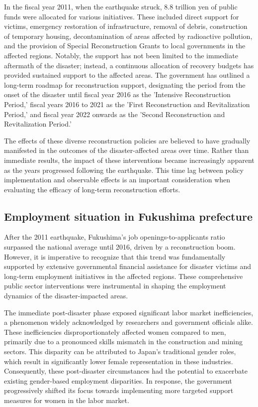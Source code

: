 \documentclass[a4paper,12pt]{article}
\begin{document}
In the fiscal year 2011, when the earthquake struck, 8.8 trillion yen of public funds were allocated for various initiatives. These included direct support for victims, emergency restoration of infrastructure, removal of debris, construction of temporary housing, decontamination of areas affected by radioactive pollution, and the provision of Special Reconstruction Grants to local governments in the affected regions. Notably, the support has not been limited to the immediate aftermath of the disaster; instead, a continuous allocation of recovery budgets has provided sustained support to the affected areas. The government has outlined a long-term roadmap for reconstruction support, designating the period from the onset of the disaster until fiscal year 2016 as the 'Intensive Reconstruction Period,' fiscal years 2016 to 2021 as the 'First Reconstruction and Revitalization Period,' and fiscal year 2022 onwards as the 'Second Reconstruction and Revitalization Period.'

The effects of these diverse reconstruction policies are believed to have gradually manifested in the outcomes of the disaster-affected areas over time. Rather than immediate results, the impact of these interventions became increasingly apparent as the years progressed following the earthquake. This time lag between policy implementation and observable effects is an important consideration when evaluating the efficacy of long-term reconstruction efforts.


\subsection{Employment situation in Fukushima prefecture}

After the 2011 earthquake, Fukushima's job openings-to-applicants ratio surpassed the national average until 2016, driven by a reconstruction boom. However, it is imperative to recognize that this trend was fundamentally supported by extensive governmental financial assistance for disaster victims and long-term employment initiatives in the affected regions. These comprehensive public sector interventions were instrumental in shaping the employment dynamics of the disaster-impacted areas.

The immediate post-disaster phase exposed significant labor market inefficiencies, a phenomenon widely acknowledged by researchers and government officials alike. These inefficiencies disproportionately affected women compared to men, primarily due to a pronounced skills mismatch in the construction and mining sectors. This disparity can be attributed to Japan's traditional gender roles, which result in significantly lower female representation in these industries. Consequently, these post-disaster circumstances had the potential to exacerbate existing gender-based employment disparities. In response, the government progressively shifted its focus towards implementing more targeted support measures for women in the labor market.
\end{document}
